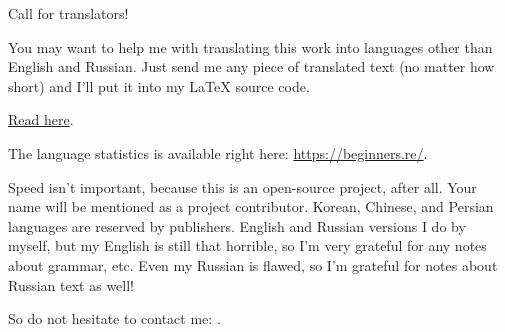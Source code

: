 \vspace*{\fill}

\Huge Call for translators!

\normalsize

\bigskip
\bigskip
\bigskip

You may want to help me with translating this work into languages other than English and Russian.
Just send me any piece of translated text (no matter how short) and I'll put it into my LaTeX source code.

\href{\RepoURL/Translation.md}{Read here}.

The language statistics is available right here: \url{https://beginners.re/}.

Speed isn't important, because this is an open-source project, after all.
Your name will be mentioned as a project contributor.
Korean, Chinese, and Persian languages are reserved by publishers.
English and Russian versions I do by myself, but my English is still that horrible, so I'm very grateful for any notes about grammar, etc.
Even my Russian is flawed, so I'm grateful for notes about Russian text as well!%

So do not hesitate to contact me: \GTT{\EMAILS}.

\vspace*{\fill}
\vfill
